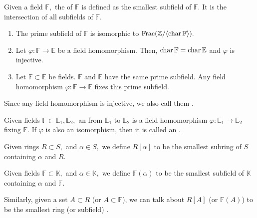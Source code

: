 \begin{defn}%
    Given a field $\mathbb{F},$ the  of $\mathbb{F}$ is defined as the smallest subfield of $\mathbb{F}.$ It is the intersection of all subfields of $\mathbb{F}.$ 
\end{defn}

\begin{prop}
    \phantom{hi}
    \begin{enumerate}
        \item The prime subfield of $\mathbb{F}$ is isomorphic to $\operatorname{Frac}(\mathbb{Z}/\langle \operatorname{char}\mathbb{F}\rangle).$
        \item Let $\varphi : \mathbb{F} \to \mathbb{E}$ be a field homomorphism. Then, $\operatorname{char} \mathbb{F} = \operatorname{char} \mathbb{E}$ and $\varphi$ is injective. 
        \item Let $\mathbb{F} \subset \mathbb{E}$ be fields. $\mathbb{F}$ and $\mathbb{E}$ have the same prime subfield. Any field homomorphism $\varphi : \mathbb{F} \to \mathbb{E}$ fixes this prime subfield.
    \end{enumerate}
\end{prop}

\begin{defn}%
    Since any field homomorphism is injective, we also call them .
\end{defn}

\begin{defn}
    Given fields $\mathbb{F} \subset \mathbb{E}_1, \mathbb{E}_2,$ an  from $\mathbb{E}_1$ to $\mathbb{E}_2$ is a field homomorphism $\varphi : \mathbb{E}_1 \to \mathbb{E}_2$ fixing $\mathbb{F}.$ If $\varphi$ is also an isomorphism, then it is called an .
\end{defn}

\begin{defn}%
    Given rings $R \subset S,$ and $\alpha \in S,$ we define $R[\alpha]$ to be the smallest subring of $S$ containing $\alpha$ and $R.$ 

    Given fields $\mathbb{F} \subset \mathbb{K},$ and $\alpha \in \mathbb{K},$ we define $\mathbb{F}(\alpha)$ to be the smallest subfield of $\mathbb{K}$ containing $\alpha$ and $\mathbb{F}.$ 

    Similarly, given a set $A \subset R$ (or $A \subset \mathbb{F}$), we can talk about $R[A]$ (or $\mathbb{F}(A)$) to be the smallest ring (or subfield) .
\end{defn}

